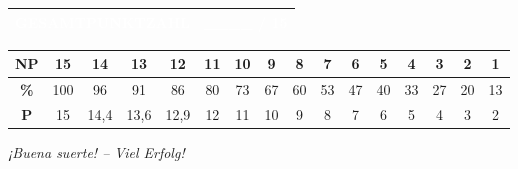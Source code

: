 \documentclass[11pt, a4paper]{article}
\begin{document}
\vspace{16pt}

\begin{center}
\begin{tabular}{|p{8cm}|p{3cm}|}
\hline
\rowcolor{spanischrot}
\textcolor{white}{\textbf{GESAMTPUNKTZAHL}} & \textcolor{white}{\textbf{\_\_\_\_ / 15}} \\
\hline
\end{tabular}
\end{center}

\vspace{12pt}

\begin{center}
{\small
\begin{tabular}{|c|c|c|c|c|c|c|c|c|c|c|c|c|c|c|c|}
\hline
\rowcolor{hellgrau}
\textbf{NP} & 15 & 14 & 13 & 12 & 11 & 10 & 9 & 8 & 7 & 6 & 5 & 4 & 3 & 2 & 1 \\
\hline
\textbf{\%} & 100 & 96 & 91 & 86 & 80 & 73 & 67 & 60 & 53 & 47 & 40 & 33 & 27 & 20 & 13 \\
\hline
\textbf{P} & 15 & 14,4 & 13,6 & 12,9 & 12 & 11 & 10 & 9 & 8 & 7 & 6 & 5 & 4 & 3 & 2 \\
\hline
\end{tabular}}
\end{center}

\vspace{8pt}

\begin{center}
\textit{¡Buena suerte! -- Viel Erfolg!}
\end{center}
\end{document}
